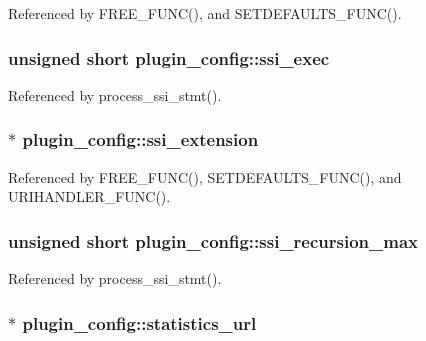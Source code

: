 Referenced by F\-R\-E\-E\-\_\-\-F\-U\-N\-C(), and S\-E\-T\-D\-E\-F\-A\-U\-L\-T\-S\-\_\-\-F\-U\-N\-C().

\hypertarget{structplugin__config_ac5912fd22d16371ddbc33b696f91e114}{
\subsubsection[{ssi\-\_\-exec}]{\setlength{\rightskip}{0pt plus 5cm}unsigned short plugin\-\_\-config\-::ssi\-\_\-exec}}\label{structplugin__config_ac5912fd22d16371ddbc33b696f91e114}


Referenced by process\-\_\-ssi\-\_\-stmt().

\hypertarget{structplugin__config_a3a055b2a593ee988adf29f98b3524475}{
\subsubsection[{ssi\-\_\-extension}]{$\ast$ plugin\-\_\-config\-::ssi\-\_\-extension}}\label{structplugin__config_a3a055b2a593ee988adf29f98b3524475}


Referenced by F\-R\-E\-E\-\_\-\-F\-U\-N\-C(), S\-E\-T\-D\-E\-F\-A\-U\-L\-T\-S\-\_\-\-F\-U\-N\-C(), and U\-R\-I\-H\-A\-N\-D\-L\-E\-R\-\_\-\-F\-U\-N\-C().

\hypertarget{structplugin__config_a0ca0f407ab5403036d02980d37c1f813}{
\subsubsection[{ssi\-\_\-recursion\-\_\-max}]{\setlength{\rightskip}{0pt plus 5cm}unsigned short plugin\-\_\-config\-::ssi\-\_\-recursion\-\_\-max}}\label{structplugin__config_a0ca0f407ab5403036d02980d37c1f813}


Referenced by process\-\_\-ssi\-\_\-stmt().

\hypertarget{structplugin__config_a3d8f2557d9fdee9bec842e2cdb091130}{
\subsubsection[{statistics\-\_\-url}]{$\ast$ plugin\-\_\-config\-::statistics\-\_\-url}}\label{structplugin__config_a3d8f2557d9fdee9bec842e2cdb091130}


